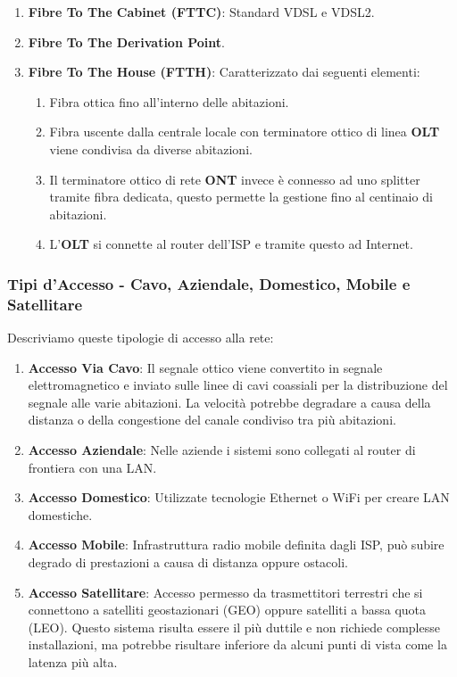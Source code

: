 \documentclass{article}
\begin{document}
\begin{enumerate}
    \item \textbf{Fibre To The Cabinet (FTTC)}: Standard VDSL e VDSL2.
    \item \textbf{Fibre To The Derivation Point}.
    \item \textbf{Fibre To The House (FTTH)}: Caratterizzato dai seguenti elementi:
    \begin{enumerate}
        \item Fibra ottica fino all'interno delle abitazioni.
        \item Fibra uscente dalla centrale locale con terminatore ottico di linea \textbf{OLT} viene condivisa da diverse abitazioni.
        \item Il terminatore ottico di rete \textbf{ONT} invece è connesso ad uno splitter tramite fibra dedicata, questo permette la gestione fino al centinaio di abitazioni.
        \item L'\textbf{OLT} si connette al router dell'ISP e tramite questo ad Internet.
    \end{enumerate}
\end{enumerate}

\vspace*{10px}

\subsubsection{Tipi d'Accesso - Cavo, Aziendale, Domestico, Mobile e Satellitare}

Descriviamo queste tipologie di accesso alla rete:

\begin{enumerate}
    \item \textbf{Accesso Via Cavo}: Il segnale ottico viene convertito in segnale elettromagnetico e inviato sulle linee di cavi coassiali per la distribuzione del segnale
    alle varie abitazioni. La velocità potrebbe degradare a causa della distanza o della congestione del canale condiviso tra più abitazioni.
    \item \textbf{Accesso Aziendale}: Nelle aziende i sistemi sono collegati al router di frontiera con una LAN.
    \item \textbf{Accesso Domestico}: Utilizzate tecnologie Ethernet o WiFi per creare LAN domestiche.
    \item \textbf{Accesso Mobile}: Infrastruttura radio mobile definita dagli ISP, può subire degrado di prestazioni a causa di distanza oppure ostacoli.
    \item \textbf{Accesso Satellitare}: Accesso permesso da trasmettitori terrestri che si connettono a satelliti geostazionari (GEO) oppure satelliti a bassa quota (LEO).
    Questo sistema risulta essere il più duttile e non richiede complesse installazioni, ma potrebbe risultare inferiore da alcuni punti di vista come la latenza più alta.
\end{enumerate}
\end{document}
